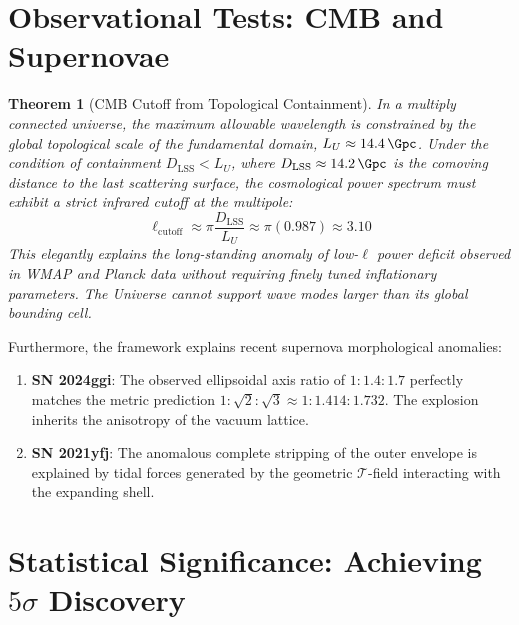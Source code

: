 \documentclass[12pt,a4paper,oneside]{article}
\theoremstyle{plain}
\newtheorem{theorem}{Theorem}[section]
\theoremstyle{definition}
\theoremstyle{remark}
\newcommand{\tension}{\mathcal{T}}
\begin{document}
\section{Observational Tests: CMB and Supernovae}
\label{sec:observational}

\begin{theorem}[CMB Cutoff from Topological Containment]
\label{thm:cmb_cutoff}
In a multiply connected universe, the maximum allowable wavelength is constrained by the global topological scale of the fundamental domain, $L_U \approx \SI{14.4}{\Gpc}$. Under the condition of containment $D_{\mathrm{LSS}} < L_U$, where $D_{\mathrm{LSS}} \approx \SI{14.2}{\Gpc}$ is the comoving distance to the last scattering surface, the cosmological power spectrum must exhibit a strict infrared cutoff at the multipole:
\begin{equation}
\ell_{\mathrm{cutoff}} \approx \pi \frac{D_{\mathrm{LSS}}}{L_U} \approx \pi (0.987) \approx 3.10
\end{equation}
This elegantly explains the long-standing anomaly of low-$\ell$ power deficit observed in WMAP and Planck data without requiring finely tuned inflationary parameters. The Universe cannot support wave modes larger than its global bounding cell.
\end{theorem}

Furthermore, the framework explains recent supernova morphological anomalies:
\begin{enumerate}
    \item \textbf{SN 2024ggi}: The observed ellipsoidal axis ratio of $1:1.4:1.7$ perfectly matches the metric prediction $1:\sqrt{2}:\sqrt{3} \approx 1:1.414:1.732$. The explosion inherits the anisotropy of the vacuum lattice.
    \item \textbf{SN 2021yfj}: The anomalous complete stripping of the outer envelope is explained by tidal forces generated by the geometric $\tension$-field interacting with the expanding shell.
\end{enumerate}

\section{Statistical Significance: Achieving \texorpdfstring{$5\sigma$}{5-sigma} Discovery}
\label{sec:significance}
\end{document}
